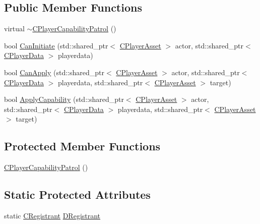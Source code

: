 \subsection*{Public Member Functions}
\begin{DoxyCompactItemize}
\item 
virtual \hyperlink{classCPlayerCapabilityPatrol_a1f27cf43aabf3360d5db92fd23b55c01}{$\sim$\+C\+Player\+Capability\+Patrol} ()
\item 
bool \hyperlink{classCPlayerCapabilityPatrol_a48e60ecd544759f3aad66afeb4a6e0a9}{Can\+Initiate} (std\+::shared\+\_\+ptr$<$ \hyperlink{classCPlayerAsset}{C\+Player\+Asset} $>$ actor, std\+::shared\+\_\+ptr$<$ \hyperlink{classCPlayerData}{C\+Player\+Data} $>$ playerdata)
\item 
bool \hyperlink{classCPlayerCapabilityPatrol_a63c099d931e1e57db01120db7b1fdbe4}{Can\+Apply} (std\+::shared\+\_\+ptr$<$ \hyperlink{classCPlayerAsset}{C\+Player\+Asset} $>$ actor, std\+::shared\+\_\+ptr$<$ \hyperlink{classCPlayerData}{C\+Player\+Data} $>$ playerdata, std\+::shared\+\_\+ptr$<$ \hyperlink{classCPlayerAsset}{C\+Player\+Asset} $>$ target)
\item 
bool \hyperlink{classCPlayerCapabilityPatrol_a6b9e361d99e256efadcd99a829f93f51}{Apply\+Capability} (std\+::shared\+\_\+ptr$<$ \hyperlink{classCPlayerAsset}{C\+Player\+Asset} $>$ actor, std\+::shared\+\_\+ptr$<$ \hyperlink{classCPlayerData}{C\+Player\+Data} $>$ playerdata, std\+::shared\+\_\+ptr$<$ \hyperlink{classCPlayerAsset}{C\+Player\+Asset} $>$ target)
\end{DoxyCompactItemize}
\subsection*{Protected Member Functions}
\begin{DoxyCompactItemize}
\item 
\hyperlink{classCPlayerCapabilityPatrol_a9c8653e6b0509a753d0b084f3988953b}{C\+Player\+Capability\+Patrol} ()
\end{DoxyCompactItemize}
\subsection*{Static Protected Attributes}
\begin{DoxyCompactItemize}
\item 
static \hyperlink{classCPlayerCapabilityPatrol_1_1CRegistrant}{C\+Registrant} \hyperlink{classCPlayerCapabilityPatrol_af3e88478d9266aa4c7f2f0457da84e89}{D\+Registrant}
\end{DoxyCompactItemize}
